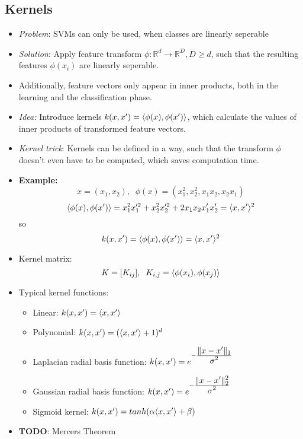 \documentclass{scrartcl}
\newcommand{\ffrac}[2]{\ensuremath{\frac{\displaystyle #1}{\displaystyle #2}}}
\DeclarePairedDelimiter\norm{\lVert}{\rVert}%
\DeclarePairedDelimiter\inner{\langle}{\rangle}%
\begin{document}
\subsection{Kernels}
\begin{itemize}
    \item
        \textit{Problem}: SVMs can only be used, when classes are linearly seperable
    \item
        \textit{Solution}: Apply feature transform $\phi: \mathbb{R}^{d} \rightarrow \mathbb{R}^{D}, D \geq d$, such that the resulting features $\phi(x_i)$ are linearly seperable.
    \item
        Additionally, feature vectors only appear in inner products, both in the learning and the classification phase.
    \item
        \textit{Idea:} Introduce kernels $k(x, x') = \inner{\phi(x), \phi(x')}$, which calculate the values of inner products of transformed feature vectors.
    \item
        \textit{Kernel trick}: Kernels can be defined in a way, such that the transform $\phi$ doesn't even have to be computed, which saves computation time.
    \item
        \textbf{Example:}
        $$x = (x_1, x_2),\;\; \phi(x) = (x_1^2, x_2^2, x_1 x_2, x_2 x_1)$$
        $$\inner{\phi(x), \phi(x')} = x_1^2 x_1 '^2 + x_2^2 x_2 '^2 + 2 x_1 x_2 x_1' x_2' = \inner{x, x'}^2$$
        so
        $$ k(x, x') = \inner{\phi(x), \phi(x')} = \inner{x,x'}^2$$
    \item
        Kernel matrix:
        $$ K = [K_{ij}], \; \; K_{i,j} = \inner{\phi(x_i), \phi(x_j)}$$
    \item
        Typical kernel functions:
        \begin{itemize}
            \item
                Linear: $k(x, x') = \inner{x, x'}$
            \item
                Polynomial: $k(x, x') = (\inner{x,x'} + 1)^d$
            \item
                Laplacian radial basis function: $k(x, x') = e^{-\ffrac{\norm{x-x'}_1}{\sigma^2}}$
            \item
                Gaussian radial basis function: $k(x, x') = e^{-\ffrac{\norm{x-x'}_2^2}{\sigma^2}}$
            \item
                Sigmoid kernel: $k(x, x') = tanh(\alpha \inner{x, x'} + \beta)$
        \end{itemize}
    \item
        \textbf{TODO}: Mercers Theorem

\end{itemize}
\end{document}
